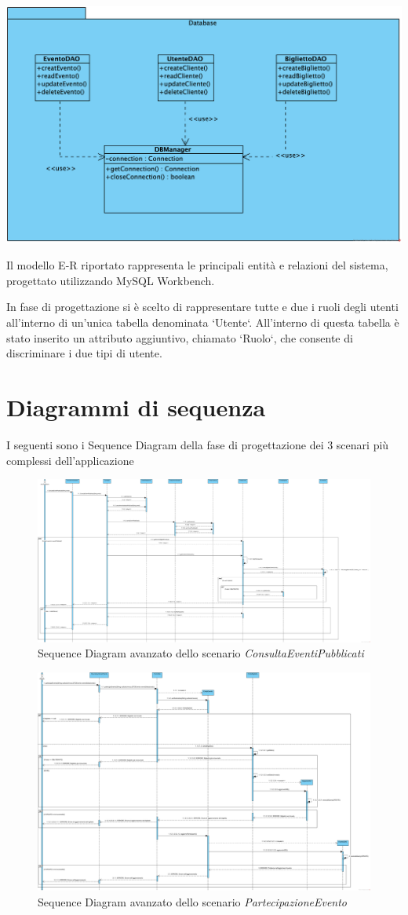 \begin{center}	
	\vspace{1ex}
	\includegraphics[height=0.38\linewidth]{assets/package/database1.png}
	\vspace{1ex}
\end{center}

Il modello E-R riportato rappresenta le principali entità e relazioni del sistema, progettato utilizzando MySQL Workbench.

In fase di progettazione si è scelto di rappresentare tutte e due i ruoli degli utenti all'interno di un'unica tabella denominata `Utente`. All'interno di questa tabella è stato inserito un attributo aggiuntivo, chiamato `Ruolo`, che consente di discriminare i due tipi di utente.

\section{Diagrammi di sequenza}
I seguenti sono i Sequence Diagram della fase di progettazione dei 3 scenari più complessi dell'applicazione
\begin{figure}[h]
	\centering
	\includegraphics[width=0.7\linewidth]{assets/casid'uso/ConsultaEventiPubblicatiAvanzato}
	\caption{Sequence Diagram avanzato dello scenario \textit{ConsultaEventiPubblicati}}
\end{figure}

\begin{figure}[h]
	\centering
	\includegraphics[width=0.7\linewidth]{assets/casid'uso/PartecipazioneEventoAvanzato}
	\caption{Sequence Diagram avanzato dello scenario \textit{PartecipazioneEvento}}
\end{figure}

